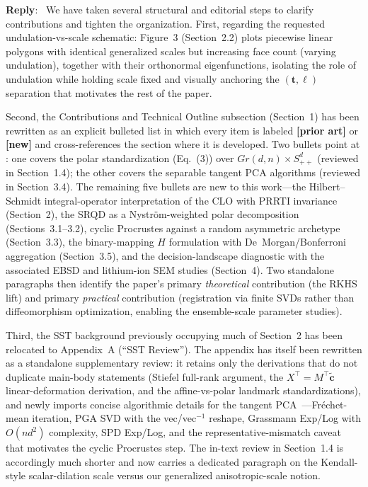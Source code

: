 \documentclass[11pt]{article}
\newcounter{reviewer}
\newcounter{point}[reviewer]
\newenvironment{reply}
   {\medskip \noindent \color{blue} \begin{sf}\textbf{Reply}:\  }
   {\medskip \par \end{sf}}
\begin{document}
\begin{reply}
We have taken several structural and editorial steps to clarify contributions and tighten the organization. First, regarding the requested undulation-vs-scale schematic: Figure~3 (Section~2.2) plots piecewise linear polygons with identical generalized scales but increasing face count (varying undulation), together with their orthonormal eigenfunctions, isolating the role of undulation while holding scale fixed and visually anchoring the $(\boldsymbol{t},\boldsymbol{\ell})$ separation that motivates the rest of the paper.

Second, the Contributions and Technical Outline subsection (Section~1) has been rewritten as an explicit bulleted list in which every item is labeled \textbf{[prior art]} or \textbf{[new]} and cross-references the section where it is developed. Two bullets point at \cite{grey2023sst}: one covers the polar standardization (Eq.~(3)) over $Gr(d,n)\times S^d_{++}$ (reviewed in Section~1.4); the other covers the separable tangent PCA algorithms (reviewed in Section~3.4). The remaining five bullets are new to this work---the Hilbert--Schmidt integral-operator interpretation of the CLO with PRRTI invariance (Section~2), the SRQD as a Nystr\"om-weighted polar decomposition (Sections~3.1--3.2), cyclic Procrustes against a random asymmetric archetype (Section~3.3), the binary-mapping $H$ formulation with De~Morgan/Bonferroni aggregation (Section~3.5), and the decision-landscape diagnostic with the associated EBSD and lithium-ion SEM studies (Section~4). Two standalone paragraphs then identify the paper's primary \emph{theoretical} contribution (the RKHS lift) and primary \emph{practical} contribution (registration via finite SVDs rather than diffeomorphism optimization, enabling the ensemble-scale parameter studies).

Third, the SST background previously occupying much of Section~2 has been relocated to Appendix~A (``SST Review''). The appendix has itself been rewritten as a standalone supplementary review: it retains only the derivations that do not duplicate main-body statements (Stiefel full-rank argument, the $X^{\top} = M^{\top}\widetilde{\boldsymbol{c}}$ linear-deformation derivation, and the affine-vs-polar landmark standardizations), and newly imports concise algorithmic details for the tangent PCA~\cite{grey2023sst, fletcher2003, fletcher2004, edelman1998, bendokat2020}---Fr\'echet-mean iteration, PGA SVD with the vec/vec$^{-1}$ reshape, Grassmann Exp/Log with $O(nd^2)$ complexity, SPD Exp/Log, and the representative-mismatch caveat that motivates the cyclic Procrustes step. The in-text review in Section~1.4 is accordingly much shorter and now carries a dedicated paragraph on the Kendall-style scalar-dilation scale versus our generalized anisotropic-scale notion.


\end{reply}
\end{document}

